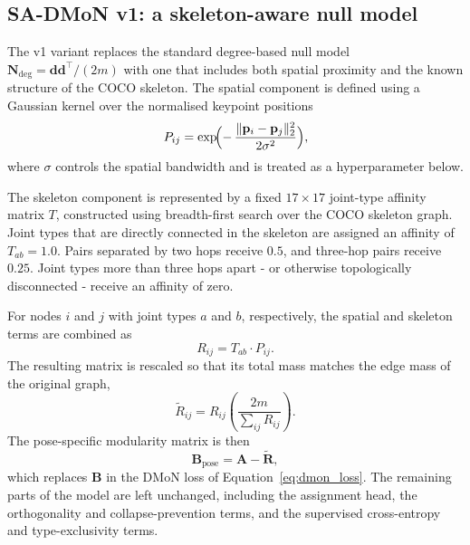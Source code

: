 \subsection{SA-DMoN v1: a skeleton-aware null model}
\label{sec_meth_sadmon_v1}

The v1 variant replaces the standard degree-based null model
$\mathbf{N}_{\text{deg}} = \mathbf{d}\mathbf{d}^\top/(2m)$ with one
that includes both spatial proximity and the known structure of the
COCO skeleton.
The spatial component is defined using a Gaussian kernel
over the normalised keypoint positions
\begin{equation}
    P_{ij}
    =
    \exp\!\Bigl(
        -\,\frac{\|\mathbf{p}_i-\mathbf{p}_j\|_2^2}{2\sigma^2}
    \Bigr),
    \label{eq:sadmon_spatial}
\end{equation}
where $\sigma$ controls the spatial bandwidth
and is treated as a hyperparameter below.

The skeleton component is represented by a fixed $17 \times 17$
joint-type affinity matrix $T$,
constructed using breadth-first search over the COCO skeleton graph.
Joint types that are directly connected in the skeleton
are assigned an affinity of $T_{ab}=1.0$.
Pairs separated by two hops receive $0.5$,
and three-hop pairs receive $0.25$.
Joint types more than three hops apart -
or otherwise topologically disconnected -
receive an affinity of zero.

For nodes $i$ and $j$ with joint types $a$ and $b$, respectively,
the spatial and skeleton terms are combined as
\begin{equation}
    R_{ij}
    =
    T_{ab} \cdot P_{ij}.
    \label{eq:sadmon_null}
\end{equation}
The resulting matrix is rescaled so that its total mass matches the
edge mass of the original graph,
\begin{equation}
    \tilde{R}_{ij}
    =
    R_{ij}
    \left(
        \frac{2m}{\sum_{ij}R_{ij}}
    \right).
\end{equation}
The pose-specific modularity matrix is then
\begin{equation}
    \mathbf{B}_{\text{pose}}
    =
    \mathbf{A} - \tilde{\mathbf{R}},
\end{equation}
which replaces $\mathbf{B}$ in the DMoN loss of
Equation~\eqref{eq:dmon_loss}.
The remaining parts of the model are left unchanged,
including the assignment head,
the orthogonality and collapse-prevention terms,
and the supervised cross-entropy and type-exclusivity terms.

